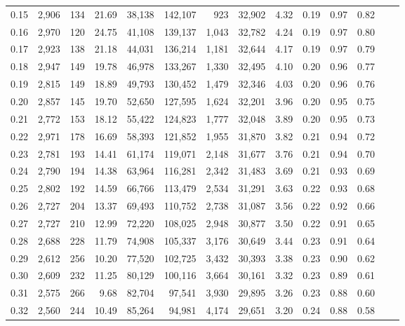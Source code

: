\begin{tabular}{rrrrrrrrrrrrrr}
0.15 &  2,906 &  134 &   21.69 &   38,138 &  142,107 &     923 &  32,902 &  4.32 &  0.19 &  0.97 &      0.82 \\
0.16 &  2,970 &  120 &   24.75 &   41,108 &  139,137 &   1,043 &  32,782 &  4.24 &  0.19 &  0.97 &      0.80 \\
0.17 &  2,923 &  138 &   21.18 &   44,031 &  136,214 &   1,181 &  32,644 &  4.17 &  0.19 &  0.97 &      0.79 \\
0.18 &  2,947 &  149 &   19.78 &   46,978 &  133,267 &   1,330 &  32,495 &  4.10 &  0.20 &  0.96 &      0.77 \\
0.19 &  2,815 &  149 &   18.89 &   49,793 &  130,452 &   1,479 &  32,346 &  4.03 &  0.20 &  0.96 &      0.76 \\
0.20 &  2,857 &  145 &   19.70 &   52,650 &  127,595 &   1,624 &  32,201 &  3.96 &  0.20 &  0.95 &      0.75 \\
0.21 &  2,772 &  153 &   18.12 &   55,422 &  124,823 &   1,777 &  32,048 &  3.89 &  0.20 &  0.95 &      0.73 \\
0.22 &  2,971 &  178 &   16.69 &   58,393 &  121,852 &   1,955 &  31,870 &  3.82 &  0.21 &  0.94 &      0.72 \\
0.23 &  2,781 &  193 &   14.41 &   61,174 &  119,071 &   2,148 &  31,677 &  3.76 &  0.21 &  0.94 &      0.70 \\
0.24 &  2,790 &  194 &   14.38 &   63,964 &  116,281 &   2,342 &  31,483 &  3.69 &  0.21 &  0.93 &      0.69 \\
0.25 &  2,802 &  192 &   14.59 &   66,766 &  113,479 &   2,534 &  31,291 &  3.63 &  0.22 &  0.93 &      0.68 \\
0.26 &  2,727 &  204 &   13.37 &   69,493 &  110,752 &   2,738 &  31,087 &  3.56 &  0.22 &  0.92 &      0.66 \\
0.27 &  2,727 &  210 &   12.99 &   72,220 &  108,025 &   2,948 &  30,877 &  3.50 &  0.22 &  0.91 &      0.65 \\
0.28 &  2,688 &  228 &   11.79 &   74,908 &  105,337 &   3,176 &  30,649 &  3.44 &  0.23 &  0.91 &      0.64 \\
0.29 &  2,612 &  256 &   10.20 &   77,520 &  102,725 &   3,432 &  30,393 &  3.38 &  0.23 &  0.90 &      0.62 \\
0.30 &  2,609 &  232 &   11.25 &   80,129 &  100,116 &   3,664 &  30,161 &  3.32 &  0.23 &  0.89 &      0.61 \\
0.31 &  2,575 &  266 &    9.68 &   82,704 &   97,541 &   3,930 &  29,895 &  3.26 &  0.23 &  0.88 &      0.60 \\
0.32 &  2,560 &  244 &   10.49 &   85,264 &   94,981 &   4,174 &  29,651 &  3.20 &  0.24 &  0.88 &      0.58 \\

\end{tabular}
